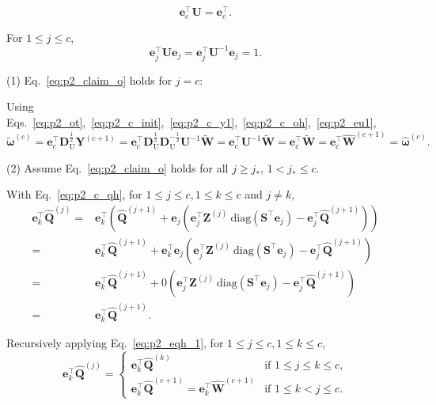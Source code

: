 \documentclass{article} %
\begin{document}
\begin{equation}
\mathbf{e}_{c}^\top \bm{U} = \mathbf{e}_{c}^\top .
\label{eq:p2_eu1}
\end{equation}

For $1 \le j \le c$,
\begin{equation}
\mathbf{e}_{j}^\top \bm{U} \mathbf{e}_{j} = \mathbf{e}_{j}^\top \bm{U}^{-1} \mathbf{e}_{j} = 1 .
\label{eq:p2_eue1}
\end{equation}

(1) Eq.~\ref{eq:p2_claim_o} holds for $j = c$:

Using Eqs.~\ref{eq:p2_ot},~\ref{eq:p2_c_init},~\ref{eq:p2_c_y1},~\ref{eq:p2_c_oh},~\ref{eq:p2_eu1},
\begin{equation}
\tilde{\bm{\omega}}^{(c)}
= \mathbf{e}_{c}^\top \bm{D}_{\mathrm{U}}^{\frac{1}{2}} \bm{Y}^{(c+1)}
= \mathbf{e}_{c}^\top \bm{D}_{\mathrm{U}}^{\frac{1}{2}} \bm{D}_{\mathrm{U}}^{-\frac{1}{2}} \bm{U}^{-1} \tilde{\bm{W}}
= \mathbf{e}_{c}^\top \bm{U}^{-1} \tilde{\bm{W}}
= \mathbf{e}_{c}^\top \tilde{\bm{W}}
= \mathbf{e}_{c}^\top \hat{\bm{W}}^{(c+1)}
= \hat{\bm{\omega}}^{(c)}.
\label{eq:p2_j1}
\end{equation}

(2) Assume Eq.~\ref{eq:p2_claim_o} holds for all $j \ge j_*$, $1 < j_* \le c$.

With Eq.~\ref{eq:p2_c_qh}, for $1 \le j \le c, 1 \le k \le c$ and $j \ne k$,
\begin{equation}
\begin{aligned}
\mathbf{e}_{k}^\top \hat{\bm{Q}}^{(j)}
= & \mathbf{e}_{k}^\top \left( \hat{\bm{Q}}^{(j+1)} + \mathbf{e}_{j} \left( \mathbf{e}_{j}^\top \bm{Z}^{(j)} \mathrm{\ diag} \left( \bm{S}^\top \mathbf{e}_{j} \right) - \mathbf{e}_{j}^\top \hat{\bm{Q}}^{(j+1)} \right) \right) \\
= & \mathbf{e}_{k}^\top \hat{\bm{Q}}^{(j+1)} + \mathbf{e}_{k}^\top \mathbf{e}_{j} \left( \mathbf{e}_{j}^\top \bm{Z}^{(j)} \mathrm{\ diag} \left( \bm{S}^\top \mathbf{e}_{j} \right) - \mathbf{e}_{j}^\top \hat{\bm{Q}}^{(j+1)} \right) \\
= & \mathbf{e}_{k}^\top \hat{\bm{Q}}^{(j+1)} + 0 \left( \mathbf{e}_{j}^\top \bm{Z}^{(j)} \mathrm{\ diag} \left( \bm{S}^\top \mathbf{e}_{j} \right) - \mathbf{e}_{j}^\top \hat{\bm{Q}}^{(j+1)} \right) \\
= & \mathbf{e}_{k}^\top \hat{\bm{Q}}^{(j+1)} .
\end{aligned}
\label{eq:p2_eqh_1}
\end{equation}

Recursively applying Eq.~\ref{eq:p2_eqh_1}, for $1 \le j \le c, 1 \le k \le c$,
\begin{equation}
\mathbf{e}_{k}^\top \hat{\bm{Q}}^{(j)}
= \begin{cases}
\mathbf{e}_{k}^\top \hat{\bm{Q}}^{(k)} & \text{if } 1 \le j \le k \le c ,\\
\mathbf{e}_{k}^\top \hat{\bm{Q}}^{(c+1)} = \mathbf{e}_{k}^\top \hat{\bm{W}}^{(c+1)}  & \text{if } 1 \le k < j \le c .
\end{cases}
\label{eq:p2_eqh}
\end{equation}
\end{document}
